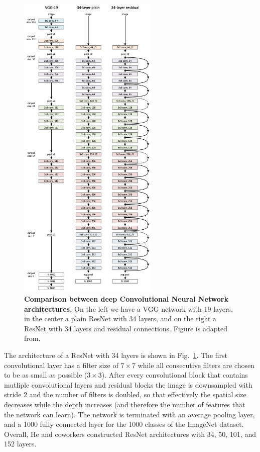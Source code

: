\begin{figure}[h!]
	\centering
	\captionsetup{width=1\linewidth}
	\includegraphics[width=0.6\textwidth]{Figures/resnet_architecture.png}
	\caption{\textbf{Comparison between deep Convolutional Neural Network architectures.} On the left we have a VGG network with 19 layers, in the center a plain ResNet with 34 layers, and on the right a ResNet with 34 layers and residual connections. Figure is adapted from\parencite{he2015}.}
	\label{fig:resnet}
\end{figure}

The architecture of a ResNet with 34 layers is shown in Fig.~\ref{fig:resnet}. The first convolutional layer has a filter size of $7\times7$ while all consecutive filters are chosen to be as small as possible ($3\times3$). After every convolutional block that contains mutliple convolutional layers and residual blocks the image is downsampled with stride 2 and the number of filters is doubled, so that effectively the spatial size decreases while the depth increases (and therefore the number of features that the network can learn). The network is terminated with an average pooling layer, and a 1000 fully connected layer for the 1000 classes of the ImageNet dataset. Overall, He and coworkers constructed ResNet architectures with 34, 50, 101, and 152 layers.

